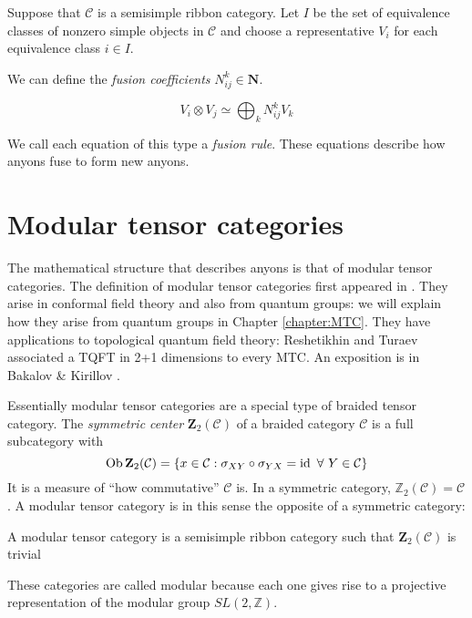     Suppose that $\mathcal{C}$ is a semisimple ribbon category. Let $I$ be the
    set of equivalence classes of nonzero simple objects in $\mathcal{C}$ and
    choose a representative $V_i$ for each equivalence class  $i \in I$.
    
    We can define the \emph{fusion coefficients} $N_{ij}^k \in \mathbf{N}$.

    \begin{equation}
        V_i \otimes V_j \simeq \bigoplus_k N_{ij}^k V_k
    \end{equation}

    We call each equation of this type a \emph{fusion rule}. These equations
    describe how anyons fuse to form new anyons.

\section{Modular tensor categories}
\label{section:MTCs}
    The mathematical structure that describes anyons is that of modular tensor
    categories. 
    The definition of modular tensor categories first appeared in \cite{MS}.
    They arise in conformal field theory and also from quantum groups: we will
    explain how they arise from quantum groups in Chapter \ref{chapter:MTC}.
    They have applications to topological quantum field theory: Reshetikhin and
    Turaev associated a TQFT in 2+1 dimensions to every MTC. An exposition is
    in Bakalov \& Kirillov \cite{Kirillov2001}.

    Essentially modular tensor categories are a special type of braided tensor
    category.  The \emph{symmetric center} $\mathbf{Z}_2(\mathcal{C})$ of a
    braided category $\mathcal{C}$ is a full subcategory with 
    \begin{equation}
        \operatorname{Ob} \mathbf{Z}_2(\mathcal{C}) = \left\{ x \in \mathcal{C} : \sigma_{XY} \circ \sigma_{YX} = \operatorname{id}\ \forall\ Y \in \mathcal{C} \right\}
    \end{equation}
    It is a measure of ``how commutative'' $\mathcal{C}$ is. In a symmetric
    category, $\mathbb{Z}_2(\mathcal{C}) = \mathcal{C}$. A modular tensor
    category is in this sense the opposite of a symmetric category:

\begin{defn}
    A modular tensor category is a semisimple ribbon category such that
    $\mathbf{Z}_2(\mathcal{C})$ is trivial
\end{defn}

These categories are called modular because each one gives rise to a projective representation of the modular group $SL(2, \mathbb{Z})$.

